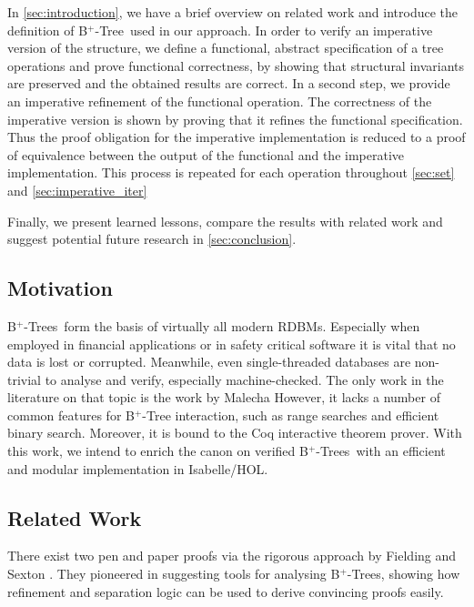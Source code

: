 \documentclass[a4paper,UKenglish,cleveref, autoref, thm-restate]{lipics-v2021}
\newcommand{\btree}{B$^+$-Tree}
\newcommand{\btrees}{B$^+$-Trees}
\begin{document}
In \autoref{sec:introduction}, we have a brief overview on related
work and introduce the definition of \btree\ used in our approach.
In order to verify an imperative version of the structure,
we define a functional, abstract specification of a tree operations
and prove functional correctness, by showing that structural invariants are preserved
and the obtained results are correct.
In a second step, we provide an imperative refinement
of the functional operation.
The correctness of the imperative version is shown by proving that it refines the functional specification.
Thus the proof obligation for the imperative implementation
is reduced to a proof of equivalence between the output of the
functional and the imperative implementation.
This process is repeated for each operation throughout
\autoref{sec:set} and \autoref{sec:imperative_iter}

Finally, we present learned lessons, compare the results with related work and suggest potential future
research in \autoref{sec:conclusion}.


\subsection{Motivation}
\label{sec:motivation}

\btrees\ form the basis of virtually all modern RDBMs.
Especially when employed in financial applications
or in safety critical software it is vital that
no data is lost or corrupted.
Meanwhile, even single-threaded databases
are non-trivial to analyse and verify,
especially machine-checked.
The only work in the literature on that topic
is the work by Malecha %
However, it lacks a number of common features for \btree
interaction, such as range searches and efficient binary search.
Moreover, it is bound to the Coq interactive theorem prover.
With this work, we intend to enrich the canon on verified
\btrees\ with an efficient and modular implementation
in Isabelle/HOL.


\subsection{Related Work}
\label{sec:related_work}

There exist two pen and paper proofs via the rigorous approach
by Fielding \cite{Fielding80} and Sexton \cite{DBLP:journals/entcs/SextonT08}.
They pioneered in suggesting tools for analysing \btrees,
showing how refinement and separation logic can be used to
derive convincing proofs easily.
\end{document}
